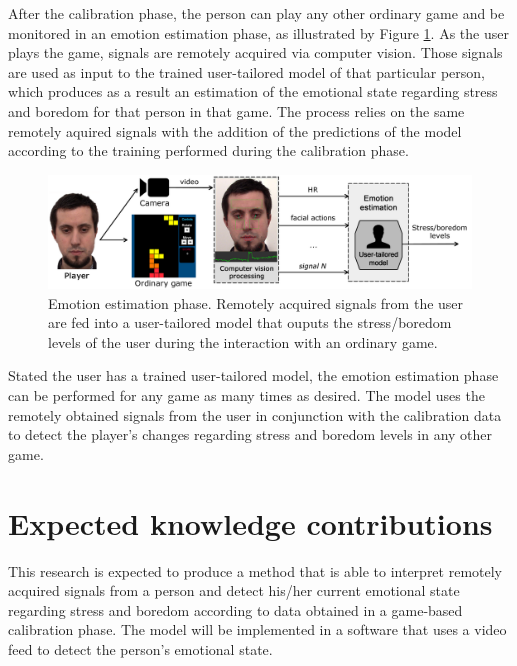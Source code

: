After the calibration phase, the person can play any other ordinary game and be monitored in an emotion estimation phase, as illustrated by Figure \ref{fig:user-tailored-use}. As the user plays the game, signals are remotely acquired via computer vision. Those signals are used as input to the trained user-tailored model of that particular person, which produces as a result an estimation of the emotional state regarding stress and boredom for that person in that game. The process relies on the same remotely aquired signals with the addition of the predictions of the model according to the training performed during the calibration phase.

\begin{figure}[h]
    \centering
    \includegraphics[width=\textwidth]{figures/user-tailored-use.png}
    \caption{Emotion estimation phase. Remotely acquired signals from the user are fed into a user-tailored model that ouputs the stress/boredom levels of the user during the interaction with an ordinary game.}
    \label{fig:user-tailored-use}
\end{figure}

Stated the user has a trained user-tailored model, the emotion estimation phase can be performed for any game as many times as desired. The model uses the remotely obtained signals from the user in conjunction with the calibration data to detect the player's changes regarding stress and boredom levels in any other game.


\section{Expected knowledge contributions}
\label{sec:contributions}

This research is expected to produce a method that is able to interpret remotely acquired signals from a person and detect his/her current emotional state regarding stress and boredom according to data obtained in a game-based calibration phase. The model will be implemented in a software that uses a video feed to detect the person's emotional state.

